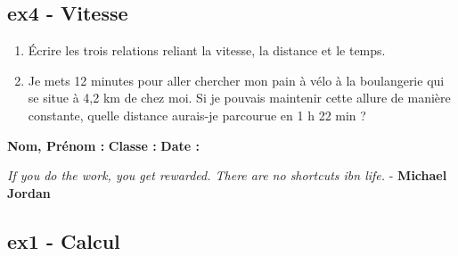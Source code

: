 \documentclass[12pt]{article}
\begin{document}
\subsection*{ex4 - Vitesse}

\begin{enumerate}
\item Écrire les trois relations reliant la vitesse, la distance et le temps.
\item Je mets 12 minutes pour aller chercher mon pain à vélo à la boulangerie qui se situe à 4,2 km de chez moi. Si je pouvais maintenir cette allure de
  manière constante, quelle distance aurais-je parcourue en 1 h 22 min ?
\end{enumerate}
\Pointilles[15]

\newpage

\textbf{Nom, Prénom :} \hspace{8cm} \textbf{Classe :} \hspace{3cm} \textbf{Date :}\\

\begin{center}
  \textit{If you do the work, you get rewarded. There are no shortcuts ibn life.}  - \textbf{Michael Jordan}
\end{center}


\subsection*{ex1 - Calcul}
\end{document}

